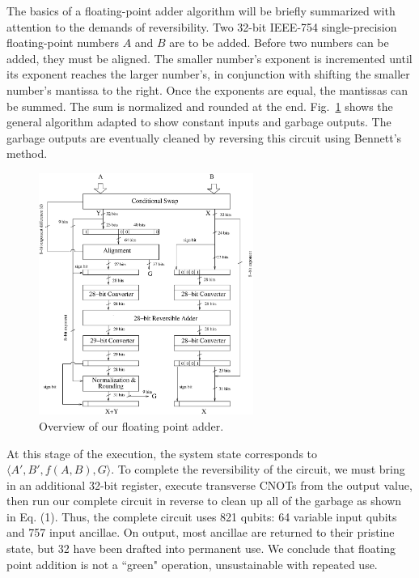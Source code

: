 \documentclass[%
reprint11,
 amsmath,amssymb,
 aps,
]{revtex4-1}
\begin{document}

The basics of a floating-point adder algorithm will be briefly
summarized with attention to the demands of reversibility. Two 32-bit
IEEE-754 single-precision floating-point numbers $A$ and $B$ are to be
added. Before two numbers can be added, they must be aligned.  The
smaller number's exponent is incremented until its exponent reaches
the larger number's, in conjunction with shifting the smaller number's
mantissa to the right. Once the exponents are equal, the mantissas can
be summed. The sum is normalized and rounded at the
end. Fig.~\ref{fig:overview} shows the general algorithm adapted to
show constant inputs and garbage outputs. The garbage outputs are
eventually cleaned by reversing this circuit using Bennett's method.

\begin{figure}[h]
\centering
\includegraphics[width=7cm]{algorithm.eps}
\caption{Overview of our floating point adder.}
\label{fig:overview}
\end{figure}

\par At this stage of the execution, the system state corresponds to
$\langle A',B',f(A,B),G \rangle $. To complete the reversibility of
the circuit, we must bring in an additional 32-bit register, execute
transverse CNOTs from the output value, then run our complete circuit
in reverse to clean up all of the garbage as shown in Eq. (1). Thus,
the complete circuit uses 821 qubits: 64 variable input qubits and 757
input ancillae. On output, most ancillae are returned to their
pristine state, but 32 have been drafted into permanent use. We
conclude that floating point addition is not a ``green" operation,
unsustainable with repeated use.

\end{document}
